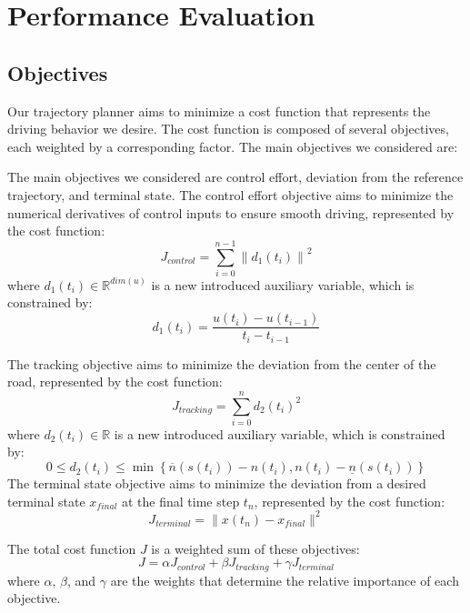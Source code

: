 \section{Performance Evaluation} \label{sec:performance-evaluation}

\subsection{Objectives} \label{subsec:objectives}

Our trajectory planner aims to minimize a cost function that represents the driving behavior we desire.
The cost function is composed of several objectives, each weighted by a corresponding factor.
The main objectives we considered are:

The main objectives we considered are control effort, deviation from the reference
trajectory, and terminal state.
The control effort objective aims to minimize the numerical derivatives of control inputs to ensure smooth driving, represented by the cost function:
\begin{equation}
	J_{control} = \sum_{i=0}^{n-1} \left\| d_1(t_i) \right\|^2
\end{equation}
where $d_1(t_i)\in \mathbb{R}^{dim(u)}$ is a new introduced auxiliary variable, which is constrained by: \[
	d_1(t_i) = \frac{u(t_i) - u(t_{i-1})}{t_i - t_{i-1}}
\]

The tracking objective aims to minimize the deviation from the center of the road, represented by the cost function:
\begin{equation}
	J_{tracking} = \sum_{i=0}^{n} d_2(t_i)^2
\end{equation}
where $d_2(t_i)\in \mathbb{R}$ is a new introduced auxiliary variable, which is constrained by: \[
	0 \leq d_2(t_i) \leq \min \left\{ \overline{n}(s(t_i)) - n(t_i), n(t_i) - \underline{n}(s(t_i)) \right\}
\]
The terminal state objective aims to minimize the deviation from a desired terminal state $x_{final}$ at the final time step $t_n$, represented by the cost function:
\begin{equation}
	J_{terminal} = \|x(t_n) - x_{final}\|^2
\end{equation}

The total cost function $J$ is a weighted sum of these objectives:
\begin{equation}
	J = \alpha J_{control} + \beta J_{tracking} + \gamma J_{terminal} \end{equation} where $\alpha$, $\beta$, and $\gamma$ are the weights that determine
the relative importance of each objective.

